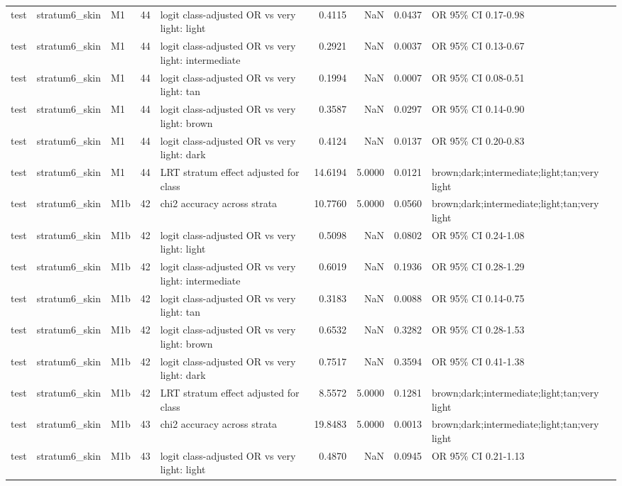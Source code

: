 \begin{tabular}{lllrlrrrl}
test & stratum6\_skin & M1 & 44 & logit class-adjusted OR vs very light: light & 0.4115 & NaN & 0.0437 & OR 95\% CI 0.17-0.98 \\
test & stratum6\_skin & M1 & 44 & logit class-adjusted OR vs very light: intermediate & 0.2921 & NaN & 0.0037 & OR 95\% CI 0.13-0.67 \\
test & stratum6\_skin & M1 & 44 & logit class-adjusted OR vs very light: tan & 0.1994 & NaN & 0.0007 & OR 95\% CI 0.08-0.51 \\
test & stratum6\_skin & M1 & 44 & logit class-adjusted OR vs very light: brown & 0.3587 & NaN & 0.0297 & OR 95\% CI 0.14-0.90 \\
test & stratum6\_skin & M1 & 44 & logit class-adjusted OR vs very light: dark & 0.4124 & NaN & 0.0137 & OR 95\% CI 0.20-0.83 \\
test & stratum6\_skin & M1 & 44 & LRT stratum effect adjusted for class & 14.6194 & 5.0000 & 0.0121 & brown;dark;intermediate;light;tan;very light \\
test & stratum6\_skin & M1b & 42 & chi2 accuracy across strata & 10.7760 & 5.0000 & 0.0560 & brown;dark;intermediate;light;tan;very light \\
test & stratum6\_skin & M1b & 42 & logit class-adjusted OR vs very light: light & 0.5098 & NaN & 0.0802 & OR 95\% CI 0.24-1.08 \\
test & stratum6\_skin & M1b & 42 & logit class-adjusted OR vs very light: intermediate & 0.6019 & NaN & 0.1936 & OR 95\% CI 0.28-1.29 \\
test & stratum6\_skin & M1b & 42 & logit class-adjusted OR vs very light: tan & 0.3183 & NaN & 0.0088 & OR 95\% CI 0.14-0.75 \\
test & stratum6\_skin & M1b & 42 & logit class-adjusted OR vs very light: brown & 0.6532 & NaN & 0.3282 & OR 95\% CI 0.28-1.53 \\
test & stratum6\_skin & M1b & 42 & logit class-adjusted OR vs very light: dark & 0.7517 & NaN & 0.3594 & OR 95\% CI 0.41-1.38 \\
test & stratum6\_skin & M1b & 42 & LRT stratum effect adjusted for class & 8.5572 & 5.0000 & 0.1281 & brown;dark;intermediate;light;tan;very light \\
test & stratum6\_skin & M1b & 43 & chi2 accuracy across strata & 19.8483 & 5.0000 & 0.0013 & brown;dark;intermediate;light;tan;very light \\
test & stratum6\_skin & M1b & 43 & logit class-adjusted OR vs very light: light & 0.4870 & NaN & 0.0945 & OR 95\% CI 0.21-1.13 \\

\end{tabular}
